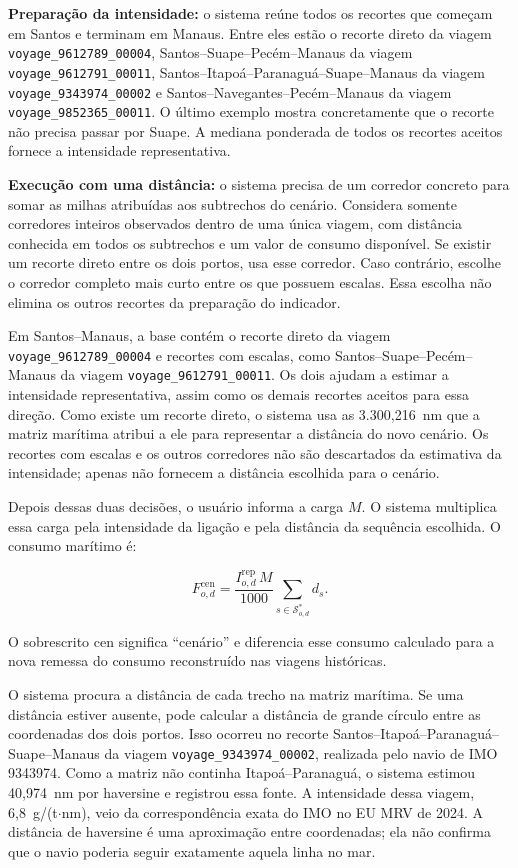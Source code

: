 \documentclass[12pt,a4paper]{article}
\begin{document}
\textbf{Preparação da intensidade:} o sistema reúne todos os recortes que começam em Santos e terminam em Manaus. Entre eles estão o recorte direto da viagem \nolinkurl{voyage_9612789_00004}, Santos--Suape--Pecém--Manaus da viagem \nolinkurl{voyage_9612791_00011}, Santos--Itapoá--Paranaguá--Suape--Manaus da viagem \nolinkurl{voyage_9343974_00002} e Santos--Navegantes--Pecém--Manaus da viagem \nolinkurl{voyage_9852365_00011}. O último exemplo mostra concretamente que o recorte não precisa passar por Suape. A mediana ponderada de todos os recortes aceitos fornece a intensidade representativa.

\textbf{Execução com uma distância:} o sistema precisa de um corredor concreto para somar as milhas atribuídas aos subtrechos do cenário. Considera somente corredores inteiros observados dentro de uma única viagem, com distância conhecida em todos os subtrechos e um valor de consumo disponível. Se existir um recorte direto entre os dois portos, usa esse corredor. Caso contrário, escolhe o corredor completo mais curto entre os que possuem escalas. Essa escolha não elimina os outros recortes da preparação do indicador.

Em Santos--Manaus, a base contém o recorte direto da viagem \nolinkurl{voyage_9612789_00004} e recortes com escalas, como Santos--Suape--Pecém--Manaus da viagem \nolinkurl{voyage_9612791_00011}. Os dois ajudam a estimar a intensidade representativa, assim como os demais recortes aceitos para essa direção. Como existe um recorte direto, o sistema usa as 3.300,216~nm que a matriz marítima atribui a ele para representar a distância do novo cenário. Os recortes com escalas e os outros corredores não são descartados da estimativa da intensidade; apenas não fornecem a distância escolhida para o cenário.

Depois dessas duas decisões, o usuário informa a carga $M$. O sistema multiplica essa carga pela intensidade da ligação e pela distância da sequência escolhida. O consumo marítimo é:

\begin{equation}
F_{o,d}^{\mathrm{cen}}=\frac{I_{o,d}^{\mathrm{rep}}\,M}{1000}
\sum_{s\in\mathcal{S}^{*}_{o,d}}d_s.
\label{eq:combustivel-cenario}
\end{equation}

O sobrescrito $\mathrm{cen}$ significa ``cenário'' e diferencia esse consumo calculado para a nova remessa do consumo reconstruído nas viagens históricas.

O sistema procura a distância de cada trecho na matriz marítima. Se uma distância estiver ausente, pode calcular a distância de grande círculo entre as coordenadas dos dois portos. Isso ocorreu no recorte Santos--Itapoá--Paranaguá--Suape--Manaus da viagem \texttt{voyage\_9343974\_00002}, realizada pelo navio de IMO 9343974. Como a matriz não continha Itapoá--Paranaguá, o sistema estimou 40,974~nm por haversine e registrou essa fonte. A intensidade dessa viagem, 6,8~g/(t$\cdot$nm), veio da correspondência exata do IMO no EU MRV de 2024. A distância de haversine é uma aproximação entre coordenadas; ela não confirma que o navio poderia seguir exatamente aquela linha no mar.
\end{document}

